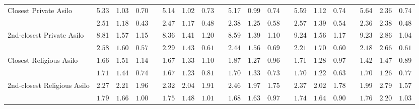 \begin{center}
{\begin{longtable}{L{5cm} c c c p{.5cm} c c c p{.5cm} c c c p{.5cm} c c c p{.5cm} c c c}
Closest Private Asilo & 5.33 &      1.03 &      0.70 & &      5.14 &      1.02 &      0.73 & &      5.17 &      0.99 &      0.74 & &      5.59 &      1.12 &      0.74 & &      5.64 &      2.36 &      0.74 \\*
& $\mathit{     2.51}$ & $\mathit{     1.18}$ & $\mathit{     0.43}$ & & $\mathit{     2.47}$ & $\mathit{     1.17}$ & $\mathit{     0.48}$ & & $\mathit{     2.38}$ & $\mathit{     1.25}$ & $\mathit{     0.58}$ & & $\mathit{     2.57}$ & $\mathit{     1.39}$ & $\mathit{     0.54}$ & & $\mathit{     2.36}$ & $\mathit{     2.38}$ & $\mathit{     0.48}$ \\[.7em]
2nd-closest Private Asilo & 8.81 &      1.57 &      1.15 & &      8.36 &      1.41 &      1.20 & &      8.59 &      1.39 &      1.10 & &      9.24 &      1.56 &      1.17 & &      9.23 &      2.86 &      1.04 \\*
& $\mathit{     2.58}$ & $\mathit{     1.60}$ & $\mathit{     0.57}$ & & $\mathit{     2.29}$ & $\mathit{     1.43}$ & $\mathit{     0.61}$ & & $\mathit{     2.44}$ & $\mathit{     1.56}$ & $\mathit{     0.69}$ & & $\mathit{     2.21}$ & $\mathit{     1.70}$ & $\mathit{     0.60}$ & & $\mathit{     2.18}$ & $\mathit{     2.66}$ & $\mathit{     0.61}$ \\[.7em]
Closest Religious Asilo & 1.66 &      1.51 &      1.14 & &      1.67 &      1.33 &      1.10 & &      1.87 &      1.27 &      0.96 & &      1.71 &      1.28 &      0.97 & &      1.42 &      1.47 &      0.89 \\*
& $\mathit{     1.71}$ & $\mathit{     1.44}$ & $\mathit{     0.74}$ & & $\mathit{     1.67}$ & $\mathit{     1.23}$ & $\mathit{     0.81}$ & & $\mathit{     1.70}$ & $\mathit{     1.33}$ & $\mathit{     0.73}$ & & $\mathit{     1.70}$ & $\mathit{     1.22}$ & $\mathit{     0.63}$ & & $\mathit{     1.70}$ & $\mathit{     1.26}$ & $\mathit{     0.77}$ \\[.7em]
2nd-closest Religious Asilo & 2.27 &      2.21 &      1.96 & &      2.32 &      2.04 &      1.91 & &      2.46 &      1.97 &      1.75 & &      2.37 &      2.02 &      1.78 & &      1.99 &      2.79 &      1.57 \\*
& $\mathit{     1.79}$ & $\mathit{     1.66}$ & $\mathit{     1.00}$ & & $\mathit{     1.75}$ & $\mathit{     1.48}$ & $\mathit{     1.01}$ & & $\mathit{     1.68}$ & $\mathit{     1.63}$ & $\mathit{     0.97}$ & & $\mathit{     1.74}$ & $\mathit{     1.64}$ & $\mathit{     0.90}$ & & $\mathit{     1.76}$ & $\mathit{     2.20}$ & $\mathit{     1.03}$ \\[.7em]

\end{longtable}}
\end{center}
